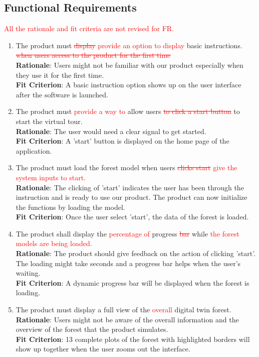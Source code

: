 \documentclass{article}
\begin{document}
\subsection{Functional Requirements}
\textcolor{red}{All the rationale and fit criteria are not revised for FR.}
\begin{enumerate}[FR1]
	\item The product must \textcolor{red}{\st{display} provide an option to display} basic
	 instructions. \textcolor{red}{\st{when users access to the product for the first time}}\\
	\textbf{Rationale}: Users might not be familiar with our product especially when they use 
	it for the first time.\\
	\textbf{Fit Criterion}: A basic instruction 
	option shows up on the user interface after the software is launched. 
	
	\item The product must \textcolor{red}{provide a way to} allow users \textcolor{red}{\st{to click a
	 start button}} to start the virtual tour.\\
	\textbf{Rationale}: The user would need a clear signal to get started.\\
	\textbf{Fit Criterion}: A 'start' button is displayed on the home page of the application.
	
	\item The product must load the forest model when users \textcolor{red}{\st{clicks start} give
	the system inputs to start.}\\
	\textbf{Rationale}: The clicking of 'start' indicates the user has been through the instruction and is ready to use our product. The product can now initialize the functions by loading the model.\\
	\textbf{Fit Criterion}: Once the user select 'start', the data of the forest is loaded.
	
	\item The product shall display the \textcolor{red}{percentage of }progress \textcolor{red}{\st{bar}} while \textcolor{red}
	 {the forest models are being loaded.} \\
	\textbf{Rationale}: The product should give feedback on the action of clicking 'start'. The loading might take seconds and a progress bar helps when the user's waiting. \\
	\textbf{Fit Criterion}: A dynamic progress bar will be displayed when the forest is loading.
	
	\item The product must display a full view of the \textcolor{red}{overall} digital twin
	forest.\\
	\textbf{Rationale}: Users might not be aware of the overall information and the overview of the forest that the product simulates.\\
	\textbf{Fit Criterion}: 13 complete plots of the forest with highlighted borders will show up together when the user zooms out the interface.
    

\end{enumerate}
\end{document}
